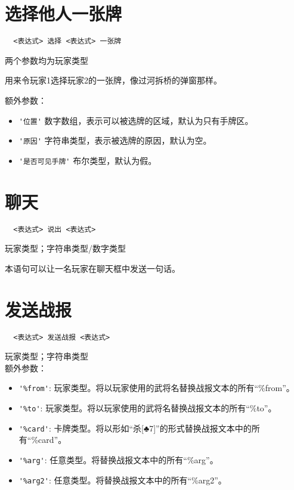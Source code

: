 \section{选择他人一张牌}

\begin{verbatim}
  <表达式> 选择 <表达式> 一张牌
\end{verbatim}

两个参数均为玩家类型

用来令玩家1选择玩家2的一张牌，像过河拆桥的弹窗那样。

额外参数：

\begin{itemize}
  \item \verb|'位置'| 数字数组，表示可以被选牌的区域，默认为只有手牌区。
  \item \verb|'原因'| 字符串类型，表示被选牌的原因，默认为空。
  \item \verb|'是否可见手牌'| 布尔类型，默认为假。
\end{itemize}

\section{聊天}

\begin{verbatim}
  <表达式> 说出 <表达式>
\end{verbatim}

玩家类型；字符串类型/数字类型

本语句可以让一名玩家在聊天框中发送一句话。

\section{发送战报}

\begin{verbatim}
  <表达式> 发送战报 <表达式>
\end{verbatim}

玩家类型；字符串类型 \\

额外参数：

\begin{itemize}
  \item \verb|'%from'|: 玩家类型。将以玩家使用的武将名替换战报文本的所有“\%from”。
  \item \verb|'%to'|: 玩家类型。将以玩家使用的武将名替换战报文本的所有“\%to”。
  \item \verb|'%card'|: 卡牌类型。将以形如“杀[♣7]”的形式替换战报文本中的所有“\%card”。
  \item \verb|'%arg'|: 任意类型。将替换战报文本中的所有“\%arg”。
  \item \verb|'%arg2'|: 任意类型。将替换战报文本中的所有“\%arg2”。
\end{itemize}

